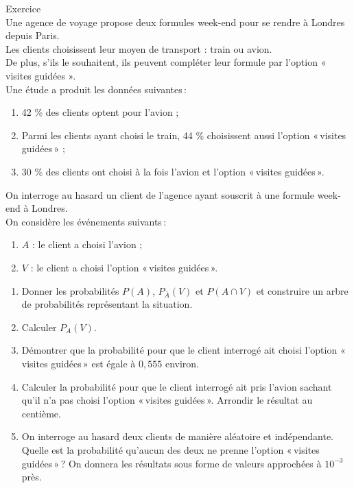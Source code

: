 \documentclass[a4paper,11pt,eval]{nsi}
\newcounter{exoNum}
\newcommand{\exo}[1]
{
	\addtocounter{exoNum}{1}
	{\titlefont\color{UGLiBlue}\Large Exercice\ \theexoNum\ \normalsize{#1}}\smallskip	
}
\begin{document}
\exo{}\\
Une agence de voyage propose deux formules week-end pour se rendre à Londres depuis Paris.\\ Les clients choisissent leur moyen de transport : train ou avion.\\ De plus, s'ils le souhaitent, ils peuvent compléter leur formule par l'option  « visites guidées ».\\[.5em]
Une étude a produit les données suivantes\,:
\begin{enumerate}[label=\textbullet]
    \item 42 \% des clients optent pour l'avion ;
    \item Parmi les clients ayant choisi le train, 44 \% choisissent aussi l'option  «\,visites guidées\,» ;
    \item 30 \% des clients ont choisi à la fois l'avion et l'option  «\,visites guidées\,».
\end{enumerate}

 On interroge au hasard un client de l'agence ayant souscrit à une formule week-end à Londres.\\ On considère les événements suivants\,:
 \begin{enumerate}[label=\textbullet]
     \item $A$ :  le client a choisi l'avion ;
     \item $V$ : le client a choisi l'option  «\,visites guidées\,».
 \end{enumerate}

\begin{enumerate}
    \item Donner les probabilités $P(A)$, $P_{\bar{A}}(V)$ et $P(A \cap V)$ et construire un arbre de probabilités représentant la situation.\\[.5em]
    \item Calculer $P_A(V)$.\\[.5em]
    \item Démontrer que la probabilité pour que le client interrogé ait choisi l'option  «\,visites guidées\,»  est égale à $0{,}555$ environ.\\[.5em]
    \item Calculer la probabilité pour que le client interrogé ait pris l'avion sachant qu'il n'a pas choisi l'option  «\,visites guidées\,». Arrondir le résultat au centième.\\[.5em]
    \item On interroge au hasard deux clients de manière aléatoire et indépendante.\\ Quelle est la probabilité qu'aucun des deux ne prenne l'option  «\,visites guidées\,»\,? On donnera les résultats sous forme de valeurs approchées à $10^{-3}$ près.\\[.5em]
\end{enumerate}
\end{document}

